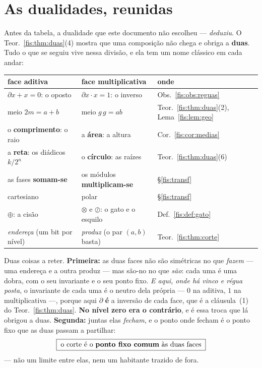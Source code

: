 \documentclass[livro.tex]{subfiles}
\begin{document}
\section{As dualidades, reunidas}\label{fis:dualidades}

\noindent Antes da tabela, a dualidade que este documento não escolheu ---
\emph{deduziu}. O Teor.~\ref{fis:thm:duas}(4) mostra que uma composição não chega
e obriga a \textbf{duas}. Tudo o que se seguiu vive nessa divisão, e ela tem um
nome clássico em cada andar:

\begin{center}\footnotesize
\begin{tabular}{@{}lll@{}}
\toprule
face \textbf{aditiva} & face \textbf{multiplicativa} & onde \\
\midrule
$\partial x+x=0$: o oposto & $\partial x\cdot x=1$: o inverso & Obs.~\ref{fis:obs:reguas} \\
meio $2m=a+b$ & meio $g\,g=ab$ & Teor.~\ref{fis:thm:duas}(2), Lema~\ref{fis:lem:geo} \\o \textbf{comprimento}: o raio & a \textbf{área}: a altura & Cor.~\ref{fis:cor:medias} \\
a \textbf{reta}: os diádicos $k/2^{n}$ & o \textbf{círculo}: as raízes & Teor.~\ref{fis:thm:duas}(6) \\
as fases \textbf{somam-se} & os módulos \textbf{multiplicam-se} & §\ref{fis:transf} \\
cartesiano & polar & §\ref{fis:transf} \\
$\oplus$: a cisão & $\otimes$ e $\oslash$: o gato e o esquilo & Def.~\ref{fis:def:gato} \\
\emph{endereça} (um bit por nível) & \emph{produz} (o par $(a,b)$ basta) & Teor.~\ref{fis:thm:corte} \\
\bottomrule
\end{tabular}
\end{center}

\medskip\noindent Duas coisas a reter. \textbf{Primeira:} as duas faces não são
simétricas no que \emph{fazem} --- uma endereça e a outra produz --- mas são-no no
que \emph{são}: cada uma é uma dobra, com o seu invariante e o seu ponto fixo.
\emph{E aqui, onde há vinco e régua posta}, o invariante de cada uma é o neutro
dela própria --- $0$ na aditiva, $1$ na multiplicativa ---, porque aqui
$\partial$ \textbf{é} a inversão de cada face, que é a cláusula~(1) do
Teor.~\ref{fis:thm:duas}. \textbf{No nível zero era o contrário}, e é essa troca
que lá obrigou a duas. \textbf{Segunda:} juntas elas
\emph{fecham}, e o ponto onde fecham é o ponto fixo que as duas passam a partilhar:
\[
\boxed{\;\text{o corte é o \textbf{ponto fixo comum} às duas faces}\;}
\]
--- não um limite entre elas, nem um habitante trazido de fora.
\end{document}

